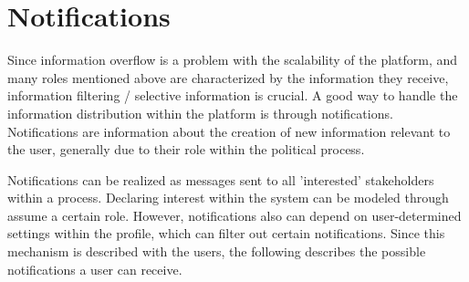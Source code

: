 % 
% 
% 



\section{Notifications}
\label{sec:Notifications}
Since information overflow is a problem with the scalability of the platform, and many roles mentioned above are characterized by the information they receive, information filtering / selective information is crucial. A good way to handle the information distribution within the platform is through notifications. Notifications are information about the creation of new information relevant to the user, generally due to their role within the political process.

Notifications can be realized as messages sent to all 'interested' stakeholders within a process. Declaring interest within the system can be modeled through assume a certain role. However, notifications also can depend on user-determined settings within the profile, which can filter out certain notifications. Since this mechanism is described with the users, the following describes the possible notifications a user can receive.

